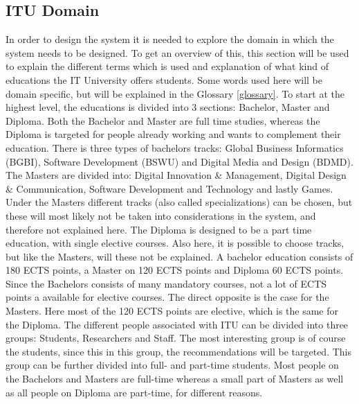 \subsection{ITU Domain}
In order to design the system it is needed to explore the domain in which the system needs to be designed. To get an overview of this, this section will be used to explain the different terms which is used and explanation of what kind of educations the IT University offers students. Some words used here will be domain specific, but will be explained in the Glossary \ref{glossary}.
To start at the highest level, the educations is divided into 3 sections: Bachelor, Master and Diploma. Both the Bachelor and Master are full time studies, whereas the Diploma is targeted for people already working and wants to complement their education. There is three types of bachelors tracks: Global Business Informatics (BGBI), Software Development (BSWU) and Digital Media and Design (BDMD). The Masters are divided into: Digital Innovation \& Management, Digital Design \& Communication, Software Development and Technology and lastly Games. Under the Masters different tracks (also called specializations) can be chosen, but these will most likely not be taken into considerations in the system, and therefore not explained here. The Diploma is designed to be a part time education, with single elective courses. Also here, it is possible to choose tracks, but like the Masters, will these not be explained. 
A bachelor education consists of 180 ECTS points, a Master on 120 ECTS points and Diploma 60 ECTS points. Since the Bachelors consists of many mandatory courses, not a lot of ECTS points a available for elective courses. The direct opposite is the case for the Masters. Here most of the 120 ECTS points are elective, which is the same for the Diploma. \newline
The different people associated with ITU can be divided into three groups: Students, Researchers and Staff. The most interesting group is of course the students, since this in this group, the recommendations will be targeted. This group can be further divided into full- and part-time students. Most people on the Bachelors and Masters are full-time whereas a small part of Masters as well as all people on Diploma are part-time, for different reasons. 
